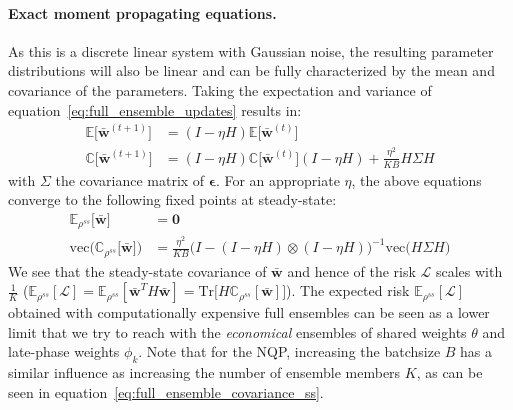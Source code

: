 \documentclass{article} \usepackage{iclr2021_conference,times}
\def\eqref#1{equation~\ref{#1}}
\begin{document}
\paragraph{Exact moment propagating equations.}
As this is a discrete linear system with Gaussian noise, the resulting parameter distributions will also be linear and can be fully characterized by the mean and covariance of the parameters. Taking the expectation and variance of \eqref{eq:full_ensemble_updates} results in: 
\begin{align}
    \mathbb{E}\big[\bar{\mathbf{w}}^{(t+1)}\big] &= (I - \eta H) \mathbb{E}\big[\bar{\mathbf{w}}^{(t)}\big]\\
    \mathbb{C}\big[\bar{\mathbf{w}}^{(t+1)}\big] &= (I - \eta H) \mathbb{C}\big[\bar{\mathbf{w}}^{(t)}\big] (I - \eta H) +  \frac{\eta^2}{KB}H\Sigma H
\end{align}
with $\Sigma$ the covariance matrix of $\boldsymbol{\epsilon}$. For an appropriate $\eta$, the above equations converge to the following fixed points at steady-state: 
\begin{align}
    \mathbb{E}_{\rho^{ss}}\big[\bar{\mathbf{w}}\big] &= \mathbf{0}\\
    \text{vec}\big(\mathbb{C}_{\rho^{ss}}\big[\bar{\mathbf{w}}\big]\big) &= \frac{\eta^2}{KB}\big(I - (I - \eta H)\otimes(I - \eta H)\big)^{-1} \text{vec}\big(H\Sigma H) \label{eq:full_ensemble_covariance_ss}
\end{align}
We see that the steady-state covariance of $\bar{\mathbf{w}}$ and hence of the risk $\mathcal{L}$ scales with $\frac{1}{K}$ ($\mathbb{E}_{\rho^{ss}}[\mathcal{L}] = \mathbb{E}_{\rho^{ss}}[\bar{\mathbf{w}}^TH\bar{\mathbf{w}}] = \text{Tr}\big[H\mathbb{C}_{\rho^{ss}}[\bar{\mathbf{w}}]\big]$). The expected risk $\mathbb{E}_{\rho^{ss}}[\mathcal{L}]$ obtained with computationally expensive full ensembles can be seen as a lower limit that we try to reach with the \textit{economical} ensembles of shared weights $\theta$ and late-phase weights $\phi_k$. Note that for the NQP, increasing the batchsize $B$ has a similar influence as increasing the number of ensemble members $K$, as can be seen in \eqref{eq:full_ensemble_covariance_ss}. 
\end{document}
